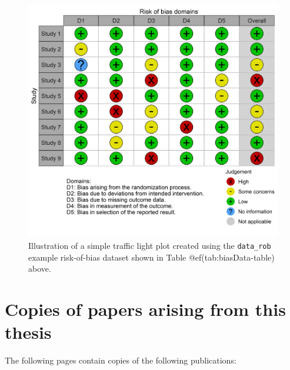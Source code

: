 \documentclass[a4paper, twoside]{templates/ociamthesis}
\begin{document}
\begin{figure}[H]
\includegraphics[width=0.8\linewidth]{figures/appendix/robTraffic} \caption[Example risk-of-bias traffic-light plot]{Illustration of a simple traffic light plot created using the \texttt{data\_rob} example risk-of-bias dataset shown in Table @ef(tab:biasData-table) above.}\label{fig:robTraffic}
\end{figure}

\newpage

\hypertarget{published-papers}{%
\section{Copies of papers arising from this thesis}\label{published-papers}}

The following pages contain copies of the following publications:
\end{document}

